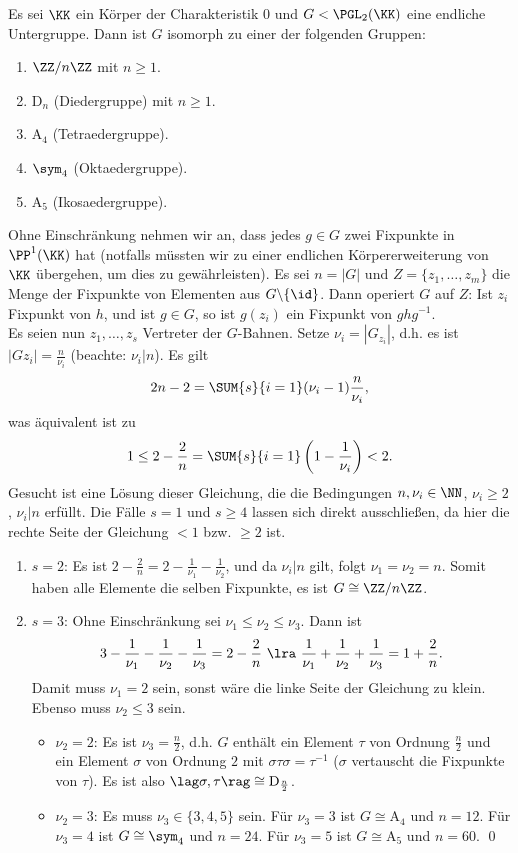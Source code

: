 \SATZ Es sei $\KK$ ein Körper der Charakteristik $0$ und
$G<\PGL_2(\KK)$ eine endliche Untergruppe.
Dann ist $G$ isomorph zu einer der folgenden Gruppen:
\begin{enumerate}
\item $\ZZ/n\ZZ$ mit $n\geq 1$.
\item $\mathrm{D}_n$ (Diedergruppe) mit $n\geq 1$.
\item $\mathrm{A}_4$ (Tetraedergruppe).
\item $\sym_4$ (Oktaedergruppe).
\item $\mathrm{A}_5$ (Ikosaedergruppe).
\end{enumerate}
\bew Ohne Einschränkung nehmen wir an, dass jedes $g\in G$ zwei
Fixpunkte in $\PP^1(\KK)$ hat (notfalls müssten wir zu einer
endlichen Körpererweiterung von $\KK$ übergehen, um dies zu
gewährleisten). Es sei $n=|G|$ und $Z=\{z_1,\ldots,z_m\}$
die Menge der Fixpunkte von Elementen aus $G\backslash\{\id\}$.
Dann operiert $G$ auf $Z$: Ist $z_i$ Fixpunkt von $h$, und ist
$g\in G$, so ist $g(z_i)$ ein Fixpunkt von $ghg^{-1}$.\\
Es seien nun $z_1,\ldots,z_s$ Vertreter der $G$-Bahnen.
Setze $\nu_i=|G_{z_i}|$, d.h. es ist $|G z_i|=\frac{n}{\nu_i}$
(beachte: $\nu_i|n$). Es gilt
\[
2n-2 = \SUM{s}{i=1}(\nu_i-1)\frac{n}{\nu_i},
\]
was äquivalent ist zu
\[
1\leq 2-\frac{2}{n} = \SUM{s}{i=1}\left(1-\frac{1}{\nu_i}\right)
< 2.
\]
Gesucht ist eine Lösung dieser Gleichung, die die Bedingungen
$n,\nu_i\in\NN$, $\nu_i\geq 2$, $\nu_i|n$ erfüllt.
Die Fälle $s=1$ und $s\geq 4$ lassen sich direkt ausschließen,
da hier die rechte Seite der Gleichung $<1$ bzw. $\geq 2$ ist.
\begin{enumerate}
\item[]$s=2$: Es ist
$2-\frac{2}{n}=2-\frac{1}{\nu_1}-\frac{1}{\nu_2}$, und da $\nu_i|n$
gilt, folgt $\nu_1=\nu_2=n$. Somit haben alle Elemente die selben
Fixpunkte, es ist $G\cong\ZZ/n\ZZ$.
\item[]$s=3$: Ohne Einschränkung sei $\nu_1\leq\nu_2\leq\nu_3$.
Dann ist
\[
3-\frac{1}{\nu_1}-\frac{1}{\nu_2}-\frac{1}{\nu_3}=2-\frac{2}{n}
\ \lra\ 
\frac{1}{\nu_1}+\frac{1}{\nu_2}+\frac{1}{\nu_3}=1+\frac{2}{n}.
\]
Damit muss $\nu_1=2$ sein, sonst wäre die linke Seite der Gleichung
zu klein. Ebenso muss $\nu_2\leq 3$ sein.
\begin{itemize}
\item[]$\nu_2=2$: Es ist $\nu_3=\frac{n}{2}$, d.h. $G$ enthält
ein Element $\tau$ von Ordnung $\frac{n}{2}$ und ein Element
$\sigma$ von Ordnung $2$ mit $\sigma\tau\sigma=\tau^{-1}$
($\sigma$ vertauscht die Fixpunkte von $\tau$).
Es ist also $\lag\sigma,\tau\rag\cong\mathrm{D}_{\frac{n}{2}}$.
\item[] $\nu_2=3$: Es muss $\nu_3\in\{3,4,5\}$ sein.
Für $\nu_3=3$ ist $G\cong\mathrm{A}_4$ und $n=12$.
Für $\nu_3=4$ ist $G\cong\sym_4$ und $n=24$.
Für $\nu_3=5$ ist $G\cong\mathrm{A}_5$ und $n=60$.
\qed
\end{itemize}
\end{enumerate}


